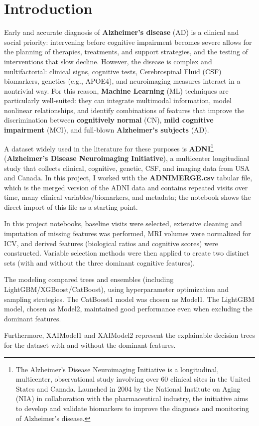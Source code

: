 \section{Introduction}
Early and accurate diagnosis of \textbf{Alzheimer's disease} (AD) is a clinical and social priority: intervening before cognitive impairment becomes severe allows for the planning of therapies, treatments, and support strategies, and the testing of interventions that slow decline. However, the disease is complex and multifactorial: clinical signs, cognitive tests, Cerebrospinal Fluid (CSF) biomarkers, genetics (e.g., APOE4), and neuroimaging measures interact in a nontrivial way. For this reason, \textbf{Machine Learning} (ML) techniques are particularly well-suited: they can integrate multimodal information, model nonlinear relationships, and identify combinations of features that improve the discrimination between \textbf{cognitively normal} (CN), \textbf{mild cognitive impairment} (MCI), and full-blown \textbf{Alzheimer's subjects} (AD).

A dataset widely used in the literature for these purposes is \textbf{ADNI}\footnote{The Alzheimer's Disease Neuroimaging Initiative is a longitudinal, multicenter, observational study involving over 60 clinical sites in the United States and Canada. Launched in 2004 by the National Institute on Aging (NIA) in collaboration with the pharmaceutical industry, the initiative aims to develop and validate biomarkers to improve the diagnosis and monitoring of Alzheimer's disease.} (\textbf{Alzheimer's Disease Neuroimaging Initiative}), a multicenter longitudinal study that collects clinical, cognitive, genetic, CSF, and imaging data from USA and Canada. In this project, I worked with the \textbf{ADNIMERGE.csv} tabular file, which is the merged version of the ADNI data and contains repeated visits over time, many clinical variables/biomarkers, and metadata; the notebook shows the direct import of this file as a starting point. 

In this project notebooks, baseline visits were selected, extensive cleaning and imputation of missing features was performed, MRI volumes were normalized for ICV, and derived features (biological ratios and cognitive scores) were constructed. Variable selection methods were then applied to create two distinct sets (with and without the three dominant cognitive features).

The modeling compared trees and ensembles (including LightGBM/XGBoost/CatBoost), using hyperparameter optimization and sampling strategies. The CatBoost1 model was chosen as Model1. The LightGBM model, chosen as Model2, maintained good performance even when excluding the dominant features. 

\newpage

Furthermore, XAIModel1 and XAIModel2 represent the explainable decision trees for the dataset with and without the dominant features.




